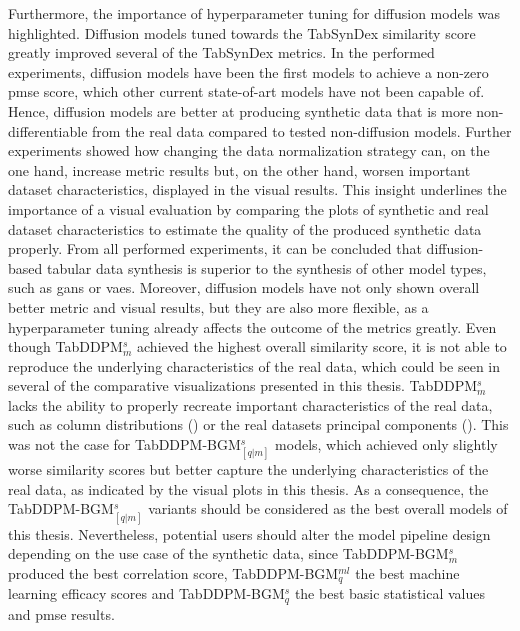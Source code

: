 Furthermore, the importance of hyperparameter tuning for diffusion \glspl{model} was highlighted.
Diffusion \glspl{model} tuned towards the TabSynDex similarity score greatly improved several of the TabSynDex metrics.
In the performed experiments, diffusion \glspl{model} have been the first \glspl{model} to achieve a non-zero \gls{pmse} score, which other current state-of-art \glspl{model} have not been capable of.
Hence, diffusion \glspl{model} are better at producing synthetic data that is more non-differentiable from the real data \cite{chundawat2022UniversalMetricRobust} compared to tested non-diffusion \glspl{model}.
Further experiments showed how changing the data normalization strategy can, on the one hand, increase metric results but, on the other hand, worsen important dataset characteristics, displayed in the visual results.
This insight underlines the importance of a visual evaluation by comparing the plots of synthetic and real dataset characteristics to estimate the quality of the produced synthetic data properly.
From all performed experiments, it can be concluded that diffusion-based tabular data synthesis is superior to the synthesis of other \gls{model} types, such as \glspl{gan} or \glspl{vae}.
Moreover, diffusion \glspl{model} have not only shown overall better metric and visual results, but they are also more flexible, as a hyperparameter tuning already affects the outcome of the metrics greatly.
Even though TabDDPM$^{s}_{m}$ achieved the highest overall similarity score, it is not able to reproduce the underlying characteristics of the real data, which could be seen in several of the comparative visualizations presented in this thesis.
TabDDPM$^{s}_{m}$ lacks the ability to properly recreate important characteristics of the real data, such as column distributions () or the real datasets principal components ().
This was not the case for TabDDPM-BGM$^{s}_{[q|m]}$ \glspl{model}, which achieved only slightly worse similarity scores but better capture the underlying characteristics of the real data, as indicated by the visual plots in this thesis.
As a consequence, the TabDDPM-BGM$^{s}_{[q|m]}$ variants should be considered as the best overall \glspl{model} of this thesis.
Nevertheless, potential users should alter the \gls{model} pipeline design depending on the use case of the synthetic data, since TabDDPM-BGM$^{s}_m$ produced the best correlation score, TabDDPM-BGM$^{ml}_q$ the best machine learning efficacy scores and TabDDPM-BGM$^{s}_q$ the best basic statistical values and \gls{pmse} results.
\newpage

